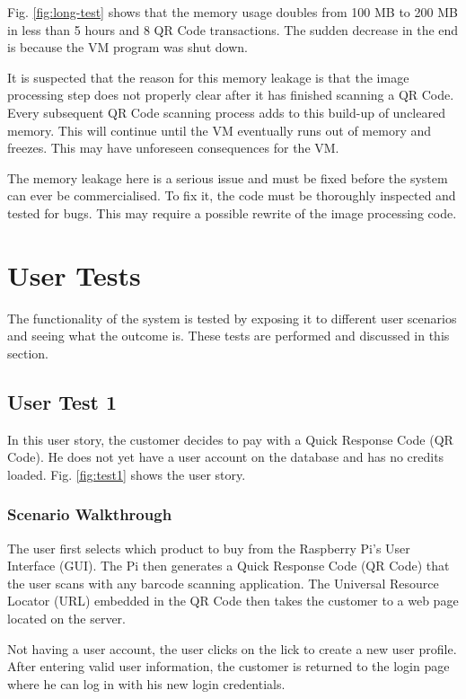 Fig. \ref{fig:long-test} shows that the memory usage doubles from 100 MB to 200 MB in less
than 5 hours and 8 QR Code transactions. The sudden decrease in the end is because the VM
program was shut down. 

It is suspected that the reason for this memory leakage is that the image processing step
does not properly clear after it has finished scanning a QR Code. Every subsequent QR Code
scanning process adds to this build-up of uncleared memory. This will continue until the
VM eventually runs out of memory and freezes. This may have unforeseen consequences for
the VM. 

The memory leakage here is a serious issue and must be fixed before the system can ever be
commercialised. To fix it, the code must be thoroughly inspected and tested for bugs.
This may require a possible rewrite of the image processing code. 

\section{User Tests}

The functionality of the system is tested by exposing it to different user scenarios and
seeing what the outcome is. These tests are performed and discussed in this section.

\subsection{User Test 1}

In this user story, the customer decides to pay with a Quick Response Code (QR Code).
He does not yet have a user account on the database and has no credits loaded.
Fig. \ref{fig:test1} shows the user story. 

\subsubsection{Scenario Walkthrough}

The user first selects which product to buy from the Raspberry
Pi's User Interface (GUI). The Pi then generates a Quick Response Code (QR Code) that the
user scans with any barcode scanning application. The Universal Resource Locator (URL)
embedded in the QR Code then takes the customer to a web page located on the server. 

Not having a user account, the user clicks on the lick to create a new user profile. After
entering valid user information, the customer is returned to the login  page where he
can log in with his new login credentials. 

